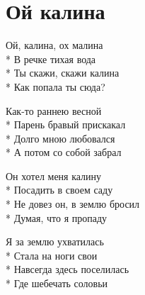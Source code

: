 \vspace{\fill}\newpage

\section{Ой калина}
\label{song:Ой_калина}

\medskip

\begin{minipage}{\linewidth}
Ой, калина, ох малина\\*
В речке тихая вода\\*
Ты скажи, скажи калина\\*
Как попала ты сюда?\\
\end{minipage}\par\medskip\nobreak

\medskip

\begin{minipage}{\linewidth}
Как-то раннею весной\\*
Парень бравый прискакал\\*
Долго мною любовался\\*
А потом со собой забрал\\
\end{minipage}\par\medskip\nobreak

\medskip

\begin{minipage}{\linewidth}
Он хотел меня калину\\*
Посадить в своем саду\\*
Не довез он, в землю бросил\\*
Думая, что я пропаду\\
\end{minipage}\par\medskip\nobreak

\medskip

\begin{minipage}{\linewidth}
Я за землю ухватилась\\*
Стала на ноги свои\\*
Навсегда здесь поселилась\\*
Где шебечать соловьи\\
\end{minipage}\par\medskip\nobreak

